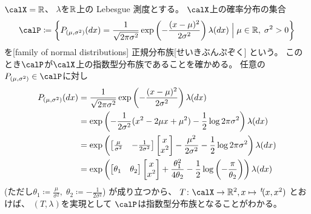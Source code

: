 \documentclass[report]{jlreq}
\begin{document}
\begin{example}[正規分布族]
    $\calX = \R$、
    $\lambda$を$\mathbb{R}$上の Lebesgue 測度とする。
    $\calX$上の確率分布の集合
    \begin{equation}
        \calP \coloneqq \mybrace{
            P_{(\mu, \sigma^2)}(dx)
                = \frac{1}{\sqrt{2\pi\sigma^2}} \exp\myparen{
                    -\frac{(x - \mu)^2}{2\sigma^2}
                } \lambda(dx)
            \;\Big|\;
            \mu \in \R, \; \sigma^2 > 0
        }
    \end{equation}
    を[family of normal distributions]
        {正規分布族}[せいきぶんぷぞく]
    という。
    このとき$\calP$が$\calX$上の指数型分布族であることを確かめる。
    任意の$P_{(\mu, \sigma^2)} \in \calP$に対し
    \begin{alignat}{1}
        P_{(\mu, \sigma^2)}(dx)
            &= \frac{1}{\sqrt{2\pi\sigma^2}} \exp\left({
                -\frac{(x - \mu)^2}{2\sigma^2}
            }\right) \lambda(dx) \\
            &= \exp\left({
                -\frac{1}{2\sigma^2} (x^2 - 2\mu x + \mu^2)
                -\frac{1}{2} \log 2\pi\sigma^2
            }\right) \lambda(dx) \\
            &= \exp\left({
                \begin{bmatrix}
                    \frac{\mu}{\sigma^2} & -\frac{1}{2\sigma^2}
                \end{bmatrix}
                \begin{bmatrix}
                    x \\ x^2
                \end{bmatrix}
                - \frac{\mu^2}{2\sigma^2}
                - \frac{1}{2} \log 2\pi\sigma^2
            }\right) \lambda(dx) \\
            &= \exp\left({
                \begin{bmatrix}
                    \theta_1 & \theta_2
                \end{bmatrix}
                \begin{bmatrix}
                    x \\ x^2
                \end{bmatrix}
                + \frac{\theta_1^2}{4\theta_2}
                - \frac{1}{2} \log\left({-\frac{\pi}{\theta_2}}\right)
            }\right) \lambda(dx)
    \end{alignat}
    (ただし$\theta_1 \coloneqq \frac{\mu}{\sigma^2}, \;
        \theta_2 \coloneqq -\frac{1}{2\sigma^2}$)
    が成り立つから、
    $T \colon \calX \to \R^2, x \mapsto \up{t}(x, x^2)$
    とおけば、
    $(T, \lambda)$を実現として
    $\calP$は指数型分布族となることがわかる。
\end{example}
\end{document}
